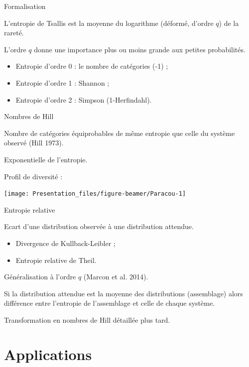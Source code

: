 \documentclass[ignorenonframetext,]{beamer}
\begin{document}
\begin{frame}{Formalisation}

L'entropie de Tsallis est la moyenne du logarithme (déformé, d'ordre
\(q\)) de la rareté.

L'ordre \(q\) donne une importance plus ou moins grande aux petites
probabilités.

\begin{itemize}
\item
  Entropie d'ordre 0 : le nombre de catégories (-1) ;
\item
  Entropie d'ordre 1 : Shannon ;
\item
  Entropie d'ordre 2 : Simpson (1-Herfindahl).
\end{itemize}

\end{frame}

\begin{frame}{Nombres de Hill}

Nombre de catégories équiprobables de même entropie que celle du système
observé (Hill 1973).

Exponentielle de l'entropie.

Profil de diversité :

\texttt{[image: Presentation\_files/figure-beamer/Paracou-1]}

\end{frame}

\begin{frame}{Entropie relative}

Ecart d'une distribution observée à une distribution attendue.

\begin{itemize}
\item
  Divergence de Kullback-Leibler ;
\item
  Entropie relative de Theil.
\end{itemize}

Généralisation à l'ordre \(q\) (Marcon et al. 2014).

Si la distribution attendue est la moyenne des distributions
(assemblage) alors différence entre l'entropie de l'assemblage et celle
de chaque système.

Transformation en nombres de Hill détaillée plus tard.

\end{frame}

\section{Applications}\label{applications}
\end{document}
